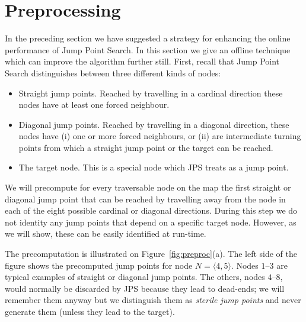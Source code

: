 \section{Preprocessing}
\label{sec::preprocessing}
In the preceding section we have suggested a strategy for enhancing the
online performance of Jump Point Search.  In this section we give an offline
technique which can improve the algorithm further still. First, recall that 
Jump Point Search distinguishes between three different kinds of
nodes:
\begin{itemize}
\item Straight jump points. Reached by travelling in a
cardinal direction these nodes have at least one forced neighbour.
\item Diagonal jump points. Reached by travelling in a diagonal direction, 
these nodes have (i) one or more forced neighbours, or (ii) are 
intermediate turning points from which a straight jump point or the 
target can be reached.
\item The target node. This is a special node which JPS treats as a jump point.
\end{itemize}

We will precompute for every traversable node on the map the first
straight or diagonal jump point that can be reached by travelling 
away from the node in each of the eight possible cardinal or diagonal 
directions. During this step we do not identity any jump points that 
depend on a specific target node.  However, as we will show, these 
can be easily identified at run-time. 


The precomputation is illustrated on Figure~\ref{fig:preproc}(a).
The left side of the figure shows the precomputed jump points 
for node $N = \langle 4,5\rangle$.  
Nodes $1$--$3$ are typical examples of straight or diagonal 
jump points.  
The others, nodes $4$--$8$, would normally be discarded 
by JPS because they lead to dead-ends; we will remember them 
anyway but we distinguish them as \emph{sterile jump points} and never
generate them (unless they lead to the target).

